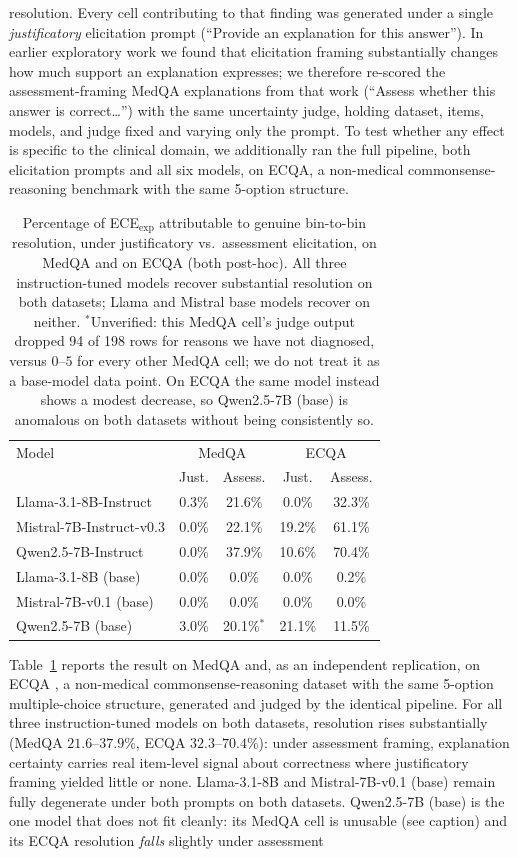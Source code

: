\documentclass[letterpaper]{article} %
\begin{document}
resolution. Every cell contributing to that finding was generated under a single \emph{justificatory} elicitation prompt (``Provide an explanation for this answer''). In earlier exploratory work we found that elicitation framing substantially changes how much support an explanation expresses; we therefore re-scored the assessment-framing MedQA explanations from that work (``Assess whether this answer is correct\ldots'') with the same uncertainty judge, holding dataset, items, models, and judge fixed and varying only the prompt. To test whether any effect is specific to the clinical domain, we additionally ran the full pipeline, both elicitation prompts and all six models, on ECQA, a non-medical commonsense-reasoning benchmark with the same 5-option structure. \begin{table}[h] \centering \small \begin{tabular}{lcccc} \toprule Model & \multicolumn{2}{c}{MedQA} & \multicolumn{2}{c}{ECQA} \\ & Just. & Assess. & Just. & Assess. \\ \midrule Llama-3.1-8B-Instruct & 0.3\% & 21.6\% & 0.0\% & 32.3\% \\ Mistral-7B-Instruct-v0.3 & 0.0\% & 22.1\% & 19.2\% & 61.1\% \\ Qwen2.5-7B-Instruct & 0.0\% & 37.9\% & 10.6\% & 70.4\% \\ \addlinespace Llama-3.1-8B (base) & 0.0\% & 0.0\% & 0.0\% & 0.2\% \\ Mistral-7B-v0.1 (base) & 0.0\% & 0.0\% & 0.0\% & 0.0\% \\ Qwen2.5-7B (base) & 3.0\% & 20.1\%$^{*}$ & 21.1\% & 11.5\% \\ \bottomrule \end{tabular} \caption{Percentage of ECE$_{\text{exp}}$ attributable to genuine bin-to-bin resolution, under justificatory vs.\ assessment elicitation, on MedQA and on ECQA (both post-hoc). All three instruction-tuned models recover substantial resolution on both datasets; Llama and Mistral base models recover on neither. $^{*}$Unverified: this MedQA cell's judge output dropped 94 of 198 rows for reasons we have not diagnosed, versus $0$--$5$ for every other MedQA cell; we do not treat it as a base-model data point. On ECQA the same model instead shows a modest decrease, so Qwen2.5-7B (base) is anomalous on both datasets without being consistently so.} \label{tab:framing} \end{table} Table~\ref{tab:framing} reports the result on MedQA and, as an independent replication, on ECQA \citep{aggarwaletal2021ecqa}, a non-medical commonsense-reasoning dataset with the same 5-option multiple-choice structure, generated and judged by the identical pipeline. For all three instruction-tuned models on both datasets, resolution rises substantially (MedQA $21.6$--$37.9\%$, ECQA $32.3$--$70.4\%$): under assessment framing, explanation certainty carries real item-level signal about correctness where justificatory framing yielded little or none. Llama-3.1-8B and Mistral-7B-v0.1 (base) remain fully degenerate under both prompts on both datasets. Qwen2.5-7B (base) is the one model that does not fit cleanly: its MedQA cell is unusable (see caption) and its ECQA resolution \emph{falls} slightly under assessment 
\end{document}
